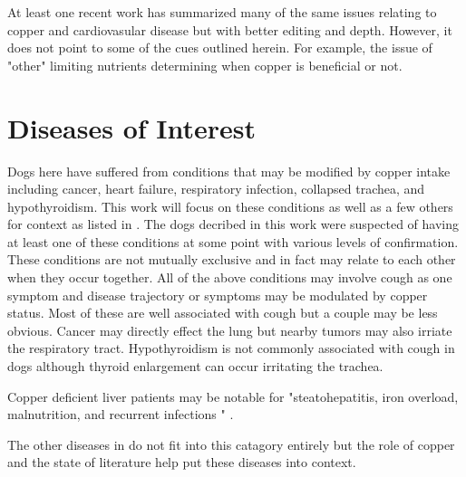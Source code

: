 
\mjmwhy


At least one recent work 
\cite{Chen_Cai_Liang_Copper_homeostasis_copper_2023} has
summarized many of the same issues relating to copper
and cardiovasular disease but with better editing and depth.
However, it does not point to some of the cues outlined herein.
For example, the issue of "other" limiting nutrients determining
when copper is beneficial or not. 


\mjmworth


\section{  Diseases of Interest }

Dogs here have suffered from 
conditions that may be modified by copper intake including  
cancer, heart failure, respiratory infection, collapsed
trachea, and hypothyroidism. 
 This work will focus on these conditions as
well as a few others for context as listed in . 
The dogs decribed in this work were suspected of having
at least one of these conditions at some point with
various levels of confirmation. 
These conditions
are not mutually exclusive and in fact may relate to each
other when they occur together. 
All of the above conditions may involve cough as one symptom
and disease trajectory or symptoms may be modulated by
copper status. 
Most of these are well associated with cough but 
a couple may be less obvious. 
Cancer may directly effect the lung but nearby tumors
may also irriate the respiratory tract. 
Hypothyroidism is
not commonly associated with cough in dogs although
thyroid enlargement can occur irritating the trachea. 

Copper deficient liver patients 
may be  notable for
"steatohepatitis, iron overload, malnutrition, and recurrent infections "
\cite{Yu_Liou_Biggins_Copper_Deficiency_Liver_2019}.

The other diseases in  do not fit into
this catagory entirely but the role of copper and the state
of literature help put these diseases into context. 

